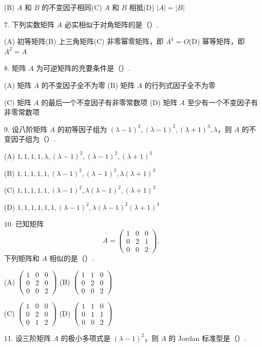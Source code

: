 \documentclass[UTF8, 12pt, fontset=fandol, oneside]{ctexart}
\begin{document}
(B) $A$ 和 $B$ 的不变因子相同\quad (C) $A$ 和 $B$ 相抵\quad (D) $|A|=|B|$

7. 下列实数矩阵 $A$ 必实相似于对角矩阵的是（\quad）.

(A) 初等矩阵\quad (B) 上三角矩阵\quad (C) 非零幂零矩阵，即 $A^k=O$\quad (D) 幂等矩阵，即 $A^2=A$

8. 矩阵 $A$ 为可逆矩阵的充要条件是（\quad）.

(A) 矩阵 $A$ 的不变因子全不为零\quad
(B) 矩阵 $A$ 的行列式因子全不为零

(C) 矩阵 $A$ 的最后一个不变因子有非零常数项\quad
(D) 矩阵 $A$ 至少有一个不变因子有非零常数项

9. 设八阶矩阵 $A$ 的初等因子组为 $(\lambda-1)^2,(\lambda-1)^2,(\lambda+1)^3,\lambda$，则 $A$ 的不变因子组为（\quad）.

(A) $1,1,1,1,\lambda,(\lambda-1)^2,(\lambda-1)^2,(\lambda+1)^3$

(B) $1,1,1,1,1,(\lambda-1)^2,(\lambda-1)^2,\lambda(\lambda+1)^3$

(C) $1,1,1,1,1,(\lambda-1)^2,\lambda(\lambda-1)^2,(\lambda+1)^3$

(D) $1,1,1,1,1,1,(\lambda-1)^2,\lambda(\lambda-1)^2(\lambda+1)^3$

10. 已知矩阵
\[
A=\left(\begin{array}{ccc}1&0&0\\0&2&1\\0&0&2\end{array}\right),
\]
下列矩阵和 $A$ 相似的是（\quad）.

(A) $\left(\begin{array}{ccc}1&0&0\\0&2&0\\0&0&2\end{array}\right)$\quad
(B) $\left(\begin{array}{ccc}1&1&0\\0&2&0\\0&0&2\end{array}\right)$

(C) $\left(\begin{array}{ccc}1&0&0\\0&2&0\\0&1&2\end{array}\right)$\quad
(D) $\left(\begin{array}{ccc}1&1&0\\0&1&1\\0&0&2\end{array}\right)$

11. 设三阶矩阵 $A$ 的极小多项式是 $(\lambda-1)^2$，则 $A$ 的 Jordan 标准型是（\quad）.
\end{document}
